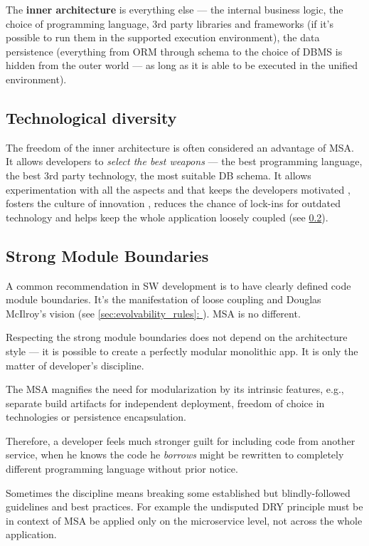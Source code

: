 \documentclass[thesis=M,english,hidelinks]{FITthesis}[2012/10/20]
\newcommand*{\fullref}[1]{\hyperref[{#1}]{\autoref*{#1}: \textit{\nameref*{#1}}}}
\begin{document}
The \textbf{inner architecture} is everything else --- the internal business logic, the choice of programming language, 3rd party libraries and frameworks (if it's possible to run them in the supported execution environment), the data persistence (everything from \acrshort{ORM} through schema to the choice of \acrshort{DBMS} is hidden from the outer world --- as long as it is able to be executed in the unified environment).

\subsection{Technological diversity}
The freedom of the inner architecture is often considered an advantage of \acrshort{MSA}. It allows developers to \textit{select the best weapons} --- the best programming language, the best 3rd party technology, the most suitable \acrshort{DB} schema. It allows experimentation with all the aspects and that keeps the developers motivated \cite{ms-building-ms, ms-3-pillars}, fosters the culture of innovation \cite{innovation-well-oiled-machine}, reduces the chance of lock-ins for outdated technology \cite{ms-building-ms} and helps keep the whole application loosely coupled (see \ref{sec:strong_boundaries}).

\subsection{Strong Module Boundaries}
\label{sec:strong_boundaries}
A common recommendation in \acrshort{SW} development is to have clearly defined code module boundaries. It's the manifestation of loose coupling and Douglas McIlroy's vision (see \fullref{sec:evolvability_rules}). \acrshort{MSA} is no different.

Respecting the strong module boundaries does not depend on the architecture style --- it is possible to create a perfectly modular monolithic app. It is only the matter of developer's discipline.

The \acrlong{MSA} magnifies the need for modularization by its intrinsic features, e.g., separate build artifacts for independent deployment, freedom of choice in technologies or persistence encapsulation.

Therefore, a developer feels much stronger guilt for including code from another service, when he knows the code he \textit{borrows} might be rewritten to completely different programming language without prior notice.

Sometimes the discipline means breaking some established but blindly-followed guidelines and best practices. For example the undisputed \acrfull{DRY} principle must be in context of \acrshort{MSA} be applied only on the microservice level, not across the whole application. 
\end{document}
